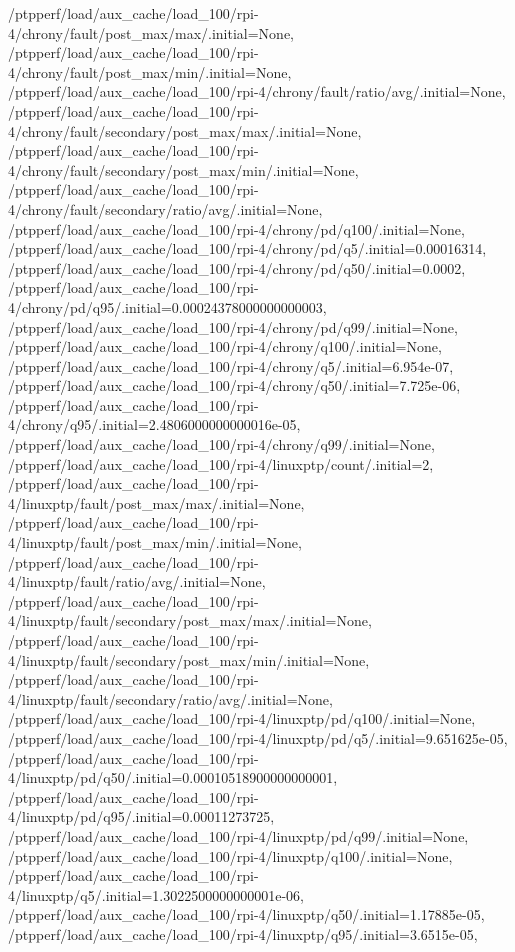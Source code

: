 {    /ptpperf/load/aux_cache/load_100/rpi-4/chrony/fault/post_max/max/.initial=None,
    /ptpperf/load/aux_cache/load_100/rpi-4/chrony/fault/post_max/min/.initial=None,
    /ptpperf/load/aux_cache/load_100/rpi-4/chrony/fault/ratio/avg/.initial=None,
    /ptpperf/load/aux_cache/load_100/rpi-4/chrony/fault/secondary/post_max/max/.initial=None,
    /ptpperf/load/aux_cache/load_100/rpi-4/chrony/fault/secondary/post_max/min/.initial=None,
    /ptpperf/load/aux_cache/load_100/rpi-4/chrony/fault/secondary/ratio/avg/.initial=None,
    /ptpperf/load/aux_cache/load_100/rpi-4/chrony/pd/q100/.initial=None,
    /ptpperf/load/aux_cache/load_100/rpi-4/chrony/pd/q5/.initial=0.00016314,
    /ptpperf/load/aux_cache/load_100/rpi-4/chrony/pd/q50/.initial=0.0002,
    /ptpperf/load/aux_cache/load_100/rpi-4/chrony/pd/q95/.initial=0.00024378000000000003,
    /ptpperf/load/aux_cache/load_100/rpi-4/chrony/pd/q99/.initial=None,
    /ptpperf/load/aux_cache/load_100/rpi-4/chrony/q100/.initial=None,
    /ptpperf/load/aux_cache/load_100/rpi-4/chrony/q5/.initial=6.954e-07,
    /ptpperf/load/aux_cache/load_100/rpi-4/chrony/q50/.initial=7.725e-06,
    /ptpperf/load/aux_cache/load_100/rpi-4/chrony/q95/.initial=2.4806000000000016e-05,
    /ptpperf/load/aux_cache/load_100/rpi-4/chrony/q99/.initial=None,
    /ptpperf/load/aux_cache/load_100/rpi-4/linuxptp/count/.initial=2,
    /ptpperf/load/aux_cache/load_100/rpi-4/linuxptp/fault/post_max/max/.initial=None,
    /ptpperf/load/aux_cache/load_100/rpi-4/linuxptp/fault/post_max/min/.initial=None,
    /ptpperf/load/aux_cache/load_100/rpi-4/linuxptp/fault/ratio/avg/.initial=None,
    /ptpperf/load/aux_cache/load_100/rpi-4/linuxptp/fault/secondary/post_max/max/.initial=None,
    /ptpperf/load/aux_cache/load_100/rpi-4/linuxptp/fault/secondary/post_max/min/.initial=None,
    /ptpperf/load/aux_cache/load_100/rpi-4/linuxptp/fault/secondary/ratio/avg/.initial=None,
    /ptpperf/load/aux_cache/load_100/rpi-4/linuxptp/pd/q100/.initial=None,
    /ptpperf/load/aux_cache/load_100/rpi-4/linuxptp/pd/q5/.initial=9.651625e-05,
    /ptpperf/load/aux_cache/load_100/rpi-4/linuxptp/pd/q50/.initial=0.00010518900000000001,
    /ptpperf/load/aux_cache/load_100/rpi-4/linuxptp/pd/q95/.initial=0.00011273725,
    /ptpperf/load/aux_cache/load_100/rpi-4/linuxptp/pd/q99/.initial=None,
    /ptpperf/load/aux_cache/load_100/rpi-4/linuxptp/q100/.initial=None,
    /ptpperf/load/aux_cache/load_100/rpi-4/linuxptp/q5/.initial=1.3022500000000001e-06,
    /ptpperf/load/aux_cache/load_100/rpi-4/linuxptp/q50/.initial=1.17885e-05,
    /ptpperf/load/aux_cache/load_100/rpi-4/linuxptp/q95/.initial=3.6515e-05,
}
